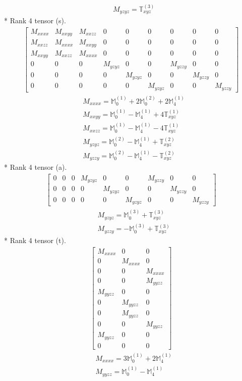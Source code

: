 \documentclass[fleqn,8pt,landscape]{jsarticle}
\begin{document}
\begin{align*}
& M_{yzyz} = \mathbb{T}_{xyz}^{(3)}
\end{align*}
* Rank 4 tensor (s).
\begin{align*}
\begin{bmatrix} M_{xxxx} & M_{xxyy} & M_{xxzz} & 0 & 0 & 0 & 0 & 0 & 0 \\ M_{xxzz} & M_{xxxx} & M_{xxyy} & 0 & 0 & 0 & 0 & 0 & 0 \\ M_{xxyy} & M_{xxzz} & M_{xxxx} & 0 & 0 & 0 & 0 & 0 & 0 \\ 0 & 0 & 0 & M_{yzyz} & 0 & 0 & M_{yzzy} & 0 & 0 \\ 0 & 0 & 0 & 0 & M_{yzyz} & 0 & 0 & M_{yzzy} & 0 \\ 0 & 0 & 0 & 0 & 0 & M_{yzyz} & 0 & 0 & M_{yzzy} \end{bmatrix}
\end{align*}
\begin{align*}
& M_{xxxx} = \mathbb{M}_{0}^{(1)} + 2 \mathbb{M}_{0}^{(2)} + 2 \mathbb{M}_{4}^{(1)} \\
& M_{xxyy} = \mathbb{M}_{0}^{(1)} - \mathbb{M}_{4}^{(1)} + 4 \mathbb{T}_{xyz}^{(1)} \\
& M_{xxzz} = \mathbb{M}_{0}^{(1)} - \mathbb{M}_{4}^{(1)} - 4 \mathbb{T}_{xyz}^{(1)} \\
& M_{yzyz} = \mathbb{M}_{0}^{(2)} - \mathbb{M}_{4}^{(1)} + \mathbb{T}_{xyz}^{(2)} \\
& M_{yzzy} = \mathbb{M}_{0}^{(2)} - \mathbb{M}_{4}^{(1)} - \mathbb{T}_{xyz}^{(2)}
\end{align*}
* Rank 4 tensor (a).
\begin{align*}
\begin{bmatrix} 0 & 0 & 0 & M_{yzyz} & 0 & 0 & M_{yzzy} & 0 & 0 \\ 0 & 0 & 0 & 0 & M_{yzyz} & 0 & 0 & M_{yzzy} & 0 \\ 0 & 0 & 0 & 0 & 0 & M_{yzyz} & 0 & 0 & M_{yzzy} \end{bmatrix}
\end{align*}
\begin{align*}
& M_{yzyz} = \mathbb{M}_{0}^{(3)} + \mathbb{T}_{xyz}^{(3)} \\
& M_{yzzy} = - \mathbb{M}_{0}^{(3)} + \mathbb{T}_{xyz}^{(3)}
\end{align*}
* Rank 4 tensor (t).
\begin{align*}
\begin{bmatrix} M_{xxxx} & 0 & 0 \\ 0 & M_{xxxx} & 0 \\ 0 & 0 & M_{xxxx} \\ 0 & 0 & M_{yyzz} \\ M_{yyzz} & 0 & 0 \\ 0 & M_{yyzz} & 0 \\ 0 & M_{yyzz} & 0 \\ 0 & 0 & M_{yyzz} \\ M_{yyzz} & 0 & 0 \\ 0 & 0 & 0 \end{bmatrix}
\end{align*}
\begin{align*}
& M_{xxxx} = 3 \mathbb{M}_{0}^{(1)} + 2 \mathbb{M}_{4}^{(1)} \\
& M_{yyzz} = \mathbb{M}_{0}^{(1)} - \mathbb{M}_{4}^{(1)}
\end{align*}
\end{document}
